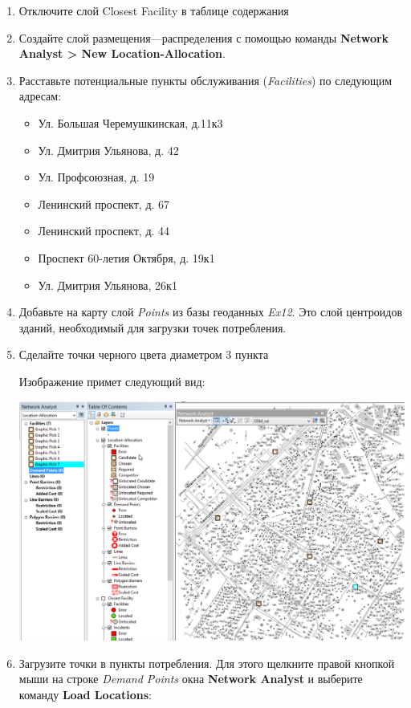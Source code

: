 \documentclass[12pt,]{book}
\begin{document}
\begin{enumerate}
\def\labelenumi{\arabic{enumi}.}
\item
  Отключите слой Closest Facility в таблице содержания
\item
  Создайте слой размещения---распределения с помощью команды \textbf{Network Analyst \textgreater{} New Location-Allocation}.
\item
  Расставьте потенциальные пункты обслуживания (\emph{Facilities}) по
  следующим адресам:

  \begin{itemize}
  \item
    Ул. Большая Черемушкинская, д.11к3
  \item
    Ул. Дмитрия Ульянова, д. 42
  \item
    Ул. Профсоюзная, д. 19
  \item
    Ленинский проспект, д. 67
  \item
    Ленинский проспект, д. 44
  \item
    Проспект 60-летия Октября, д. 19к1
  \item
    Ул. Дмитрия Ульянова, 26к1
  \end{itemize}
\item
  Добавьте на карту слой \emph{Points} из базы геоданных \emph{Ex12}. Это слой центроидов зданий, необходимый для загрузки точек потребления.
\item
  Сделайте точки черного цвета диаметром 3 пункта

  Изображение примет следующий вид:

  \includegraphics{images/Ex12/image21.png}
\item
  Загрузите точки в пункты потребления. Для этого щелкните правой кнопкой мыши на строке \emph{Demand Points} окна \textbf{Network Analyst} и выберите команду \textbf{Load Locations}:


\end{enumerate}
\end{document}
